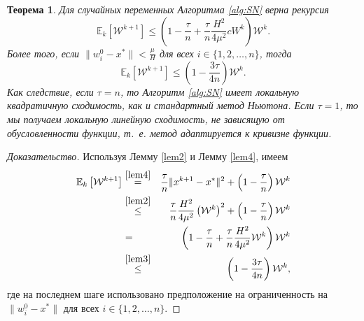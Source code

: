 \documentclass[a4paper, 12pt]{article}
\newcommand{\Exp}{\mathbb{E}}
\newcommand{\cW}{{\mathcal{W}}}
\newtheorem{theorem1}{Теорема}
\begin{document}
	\begin{theorem1}
		Для случайных переменных Алгоритма \ref{alg:SN} верна рекурсия
		\begin{equation}
			\Exp_k\left[\cW^{k+1}\right] \leq \left(1-\frac{\tau}{n}+\frac{\tau}{n}\frac{H^2}{4\mu^2}cW^k\right)\cW^k.
		\end{equation}
		Более того, если $\|w_i^0-x^*\| < \frac{\mu}{H}$ для всех $i \in \{1,2,\dots,n\}$, тогда 
		\begin{equation}
			\Exp_k\left[\cW^{k+1}\right] \leq \left(1-\frac{3\tau}{4n}\right)\cW^k.
		\end{equation}
		Как следствие, если $\tau = n$, то Алгоритм \ref{alg:SN} имеет локальную квадратичную сходимость, как и стандартный метод Ньютона. Если $\tau=1$, то мы получаем локальную линейную сходимость, не зависящую от обусловленности функции, т.~е. метод адаптируется к кривизне функции.
	\end{theorem1}
	\begin{proof}[Доказательство]
		Используя Лемму \ref{lem2} и Лемму \ref{lem4}, имеем
		\begin{eqnarray*}
			\Exp_k\left[\cW^{k+1}\right]&\overset{\eqref{lem4}}{=}& \frac{\tau}{n}\|x^{k+1}-x^*\|^2+\left(1-\frac{\tau}{n}\right)\cW^k\\
			&\overset{\eqref{lem2}}{\leq}& \frac{\tau}{n}\frac{H^2}{4\mu^2}\left(\cW^k\right)^2+\left(1-\frac{\tau}{n}\right)\cW^k\\
			&=&\left(1-\frac{\tau}{n}+\frac{\tau}{n}\frac{H^2}{4\mu^2}\cW^k\right)\cW^k\\
			&\overset{\eqref{lem3}}{\leq}&\left(1-\frac{3\tau}{4n}\right)\cW^k,
		\end{eqnarray*}
		где на последнем шаге использовано предположение на ограниченность на $\|w_i^0-x^*\|$ для всех $i\in\{1,2,\dots,n\}$.
	\end{proof}
\end{document}
